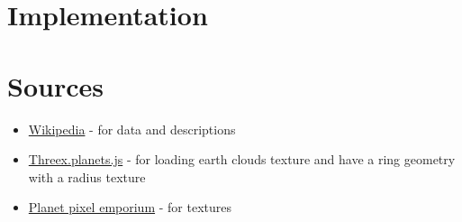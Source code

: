 \documentclass{article}
\begin{document}
\section{Implementation}


\appendix
\appendixpage
\addappheadtotoc
\section{Sources}
\begin{itemize}
	\item \href{https://www.wikipedia.org/}{Wikipedia} - for data and descriptions
	\item \href{https://github.com/jeromeetienne/threex.planets/blob/master/threex.planets.js}{Threex.planets.js} - for loading earth clouds texture and have a ring geometry with a radius texture
	\item \href{http://planetpixelemporium.com/planets.html}{Planet pixel emporium} - for textures
	
\end{itemize}
\end{document}
